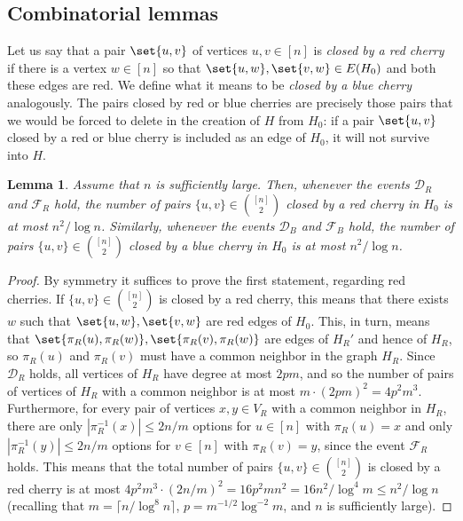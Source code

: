\documentclass[11pt,reqno,oneside]{amsart}
\newtheorem{lemma}[theorem]{Lemma}
\theoremstyle{definition}
\newcommand\margindef[1]{\marginpar{\textcolor{gray!70!black}{\scriptsize #1}}}
\newcommand\1{\mathbf{1}}
\let\leq\leqslant
\begin{document}
\subsection{Combinatorial lemmas}
 Let us say that a pair $\set{u,v}$ of vertices $u,v \in [n]$ is \emph{closed by a red cherry}\margindef{{closed by red or blue cherry}} if there is a vertex $w \in [n]$ so that $\set{u,w},\set{v,w} \in E(H_0)$ and both these edges are red. We define what it means to be \emph{closed by a blue cherry} analogously. The pairs closed by red or blue cherries are precisely those pairs that we would be forced to delete in the creation of $H$ from $H_0$: if a pair $\set{u,v}$ closed by a red or blue cherry is included as an edge of $H_0$, it will not survive into $H$. 
\begin{lemma}\label{lem:closed by cherries}
    Assume that $n$ is sufficiently large. Then, whenever the events $\mathcal D_R$ and $\mathcal F_R$ hold, the number of pairs $\{u,v\} \in \binom{[n]}2$ closed by a red cherry in $H_0$ is at most $n^2/{\log n}$. Similarly, whenever the events $\mathcal D_B$ and $\mathcal F_B$ hold, the number of pairs $\{u,v\} \in \binom{[n]}2$ closed by a blue cherry in $H_0$ is at most $n^2/{\log n}$.
\end{lemma}
\begin{proof}    
	By symmetry it suffices to prove the first statement, regarding red cherries. If $\{u,v\} \in \binom{[n]}2$ is closed by a red cherry, this means that there exists $w$ such that $\set{u,w},\set{v,w}$ are red edges of $H_0$. This, in turn, means that $\set{\pi_R(u),\pi_R(w)}, \set{\pi_R(v),\pi_R(w)}$ are edges of $H_R'$ and hence of $H_R$, so $\pi_R(u)$ and $\pi_R(v)$ must have a common neighbor in the graph $H_R$. Since $\mathcal D_R$ holds, all vertices of $H_R$ have degree at most $2pm$, and so the number of pairs of vertices of $H_R$ with a common neighbor is at most $m\cdot (2pm)^2=4p^2m^3$. Furthermore, for every pair of vertices $x,y\in V_R$ with a common neighbor in $H_R$, there are only $|\pi_R^{-1}(x)|\leq 2n/m$ options for $u\in [n]$ with $\pi_R(u)=x$ and only $|\pi_R^{-1}(y)|\leq 2n/m$ options for $v\in [n]$ with $\pi_R(v)=y$, since the event $\mathcal F_R$ holds. This means that the total number of pairs $\{u,v\} \in \binom{[n]}2$ is closed by a red cherry is at most $4p^2m^3\cdot (2n/m)^2=16p^2mn^2=16n^2/{\log^{4} m}\leq n^2/{\log n}$ (recalling that $m=\lceil n/{\log^{8} n}\rceil$, $p=m^{-1/2}\log^{-2}m$, and $n$ is sufficiently large).
\end{proof}
\end{document}
